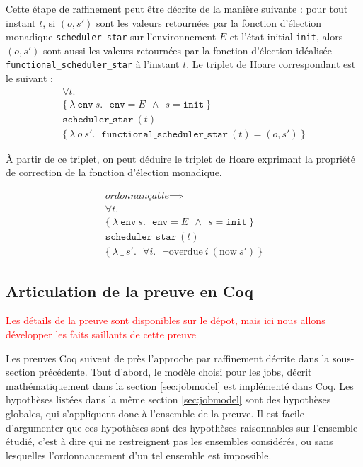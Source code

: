 	Cette étape de raffinement peut être décrite de la manière suivante : pour tout instant $t$, si $(o, s')$ sont les valeurs retournées par la fonction d'élection monadique \texttt{scheduler\_star} sur l'environnement $E$ et l'état initial \texttt{init}, alors $(o, s')$ sont aussi les valeurs retournées par la fonction d'élection idéalisée \texttt{functional\_scheduler\_star} à l'instant $t$. Le triplet de Hoare correspondant est le suivant :
	\begin{gather*}
		\forall t.\\
		\{
		~\lambda~\mathtt{env}~s.~~~\mathtt{env} = E~~\land~~s = \mathtt{init}~
		\}\\
		\texttt{scheduler\_star}~(t)\\
		\{
		~\lambda~o~s'.~~~\texttt{functional\_scheduler\_star}~(t) = (o,s')~
		\}
	\end{gather*}

	À partir de ce triplet, on peut déduire le triplet de Hoare exprimant la propriété de correction de la fonction d'élection monadique.

	\begin{gather*}
		\textit{ordonnançable} \implies\\
		\forall t.\\
		\{
		~\lambda~\mathtt{env}~s.~~~\mathtt{env} = E~~\land~~s = \mathtt{init}~
		\}\\
		\texttt{scheduler\_star}~(t)\\
		\{
		~\lambda~\_~s'.~~~\forall i.~~~\neg \text{overdue}~i~(\text{now}~s') ~
		\}
	\end{gather*}


	\subsection{Articulation de la preuve en Coq}

	\textcolor{red}{Les détails de la preuve sont disponibles sur le dépot, mais ici nous allons développer les faits saillants de cette preuve}

	Les preuves Coq suivent de près l'approche par raffinement décrite dans la sous-section précédente. Tout d'abord, le modèle choisi pour les jobs, décrit mathématiquement dans la section \ref{sec:jobmodel} est implémenté dans Coq. Les hypothèses listées dans la même section \ref{sec:jobmodel} sont des hypothèses globales, qui s'appliquent donc à l'ensemble de la preuve. Il est facile d'argumenter que ces hypothèses sont des hypothèses raisonnables sur l'ensemble étudié, c'est à dire qui ne restreignent pas les ensembles considérés, ou sans lesquelles l'ordonnancement d'un tel ensemble est impossible.

